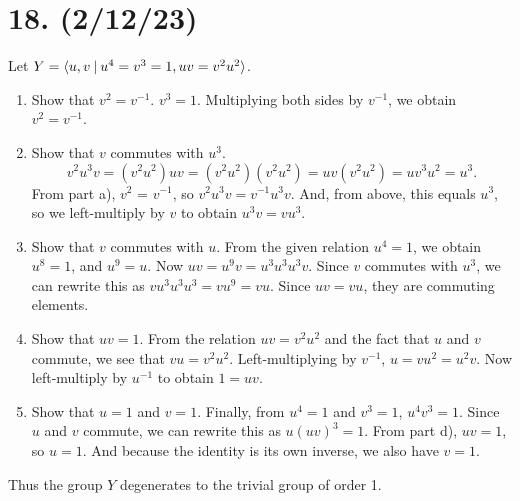 \documentclass{article}
\begin{document}
\section*{18. (2/12/23)}

Let $Y = \langle u, v \hspace{0.5ex}|\hspace{0.5ex} u^4 = v^3 = 1, uv = v^2 u^2 \rangle$.

\begin{enumerate}[label=(\alph*)]
    \item Show that $v^2 = v^{-1}$.
          $v^3 = 1$. Multiplying both sides by $v^{-1}$, we obtain $v^2 = v^{-1}$.
    \item Show that $v$ commutes with $u^3$.
          \begin{equation*}
            v^2 u^3 v = (v^2 u^2) uv = (v^2 u^2)(v^2 u^2) = uv(v^2 u^2) = uv^3 u^2 = u^3.
          \end{equation*}
          From part a), $v^2$ = $v^{-1}$, so $v^2 u^3 v = v^{-1} u^3 v$. And, from above, this equals $u^3$, so we left-multiply by $v$ to obtain $u^3 v = v u^3$.
    \item Show that $v$ commutes with $u$.
          From the given relation $u^4 = 1$, we obtain $u^8 = 1$, and $u^9 = u$. Now $uv = u^9 v = u^3 u^3 u^3 v$. Since $v$ commutes with $u^3$, we can rewrite this as $v u^3 u^3 u^3 = v u^9 = vu$. Since $uv = vu$, they are commuting elements.
    \item Show that $uv = 1$.
          From the relation $uv = v^2 u^2$ and the fact that $u$ and $v$ commute, we see that $vu = v^2 u^2$. Left-multiplying by $v^{-1}$, $u = v u^2 = u^2 v$. Now left-multiply by $u^{-1}$ to obtain $1 = uv$.
    \item Show that $u = 1$ and $v = 1$.
          Finally, from $u^4 = 1$ and $v^3 = 1$, $u^4 v^3 = 1$. Since $u$ and $v$ commute, we can rewrite this as $u(uv)^3 = 1$. From part d), $uv = 1$, so $u = 1$. And because the identity is its own inverse, we also have $v = 1$.
\end{enumerate}

Thus the group $Y$ degenerates to the trivial group of order 1.
\end{document}
